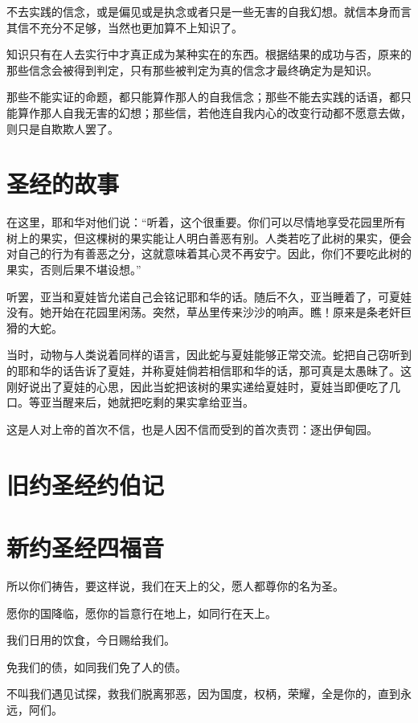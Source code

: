 \documentclass[12pt,oneside]{book}
\begin{document}
不去实践的信念，或是偏见或是执念或者只是一些无害的自我幻想。就信本身而言其信不充分不足够，当然也更加算不上知识了。

知识只有在人去实行中才真正成为某种实在的东西。根据结果的成功与否，原来的那些信念会被得到判定，只有那些被判定为真的信念才最终确定为是知识。

那些不能实证的命题，都只能算作那人的自我信念；那些不能去实践的话语，都只能算作那人自我无害的幻想；那些信，若他连自我内心的改变行动都不愿意去做，则只是自欺欺人罢了。



\section{圣经的故事}
\begin{bookref}[frametitle={\cite{圣经的故事}}]
在这里，耶和华对他们说：“听着，这个很重要。你们可以尽情地享受花园里所有树上的果实，但这棵树的果实能让人明白善恶有别。人类若吃了此树的果实，便会对自己的行为有善恶之分，这就意味着其心灵不再安宁。因此，你们不要吃此树的果实，否则后果不堪设想。”

听罢，亚当和夏娃皆允诺自己会铭记耶和华的话。随后不久，亚当睡着了，可夏娃没有。她开始在花园里闲荡。突然，草丛里传来沙沙的响声。瞧！原来是条老奸巨猾的大蛇。

当时，动物与人类说着同样的语言，因此蛇与夏娃能够正常交流。蛇把自己窃听到的耶和华的话告诉了夏娃，并称夏娃倘若相信耶和华的话，那可真是太愚昧了。这刚好说出了夏娃的心思，因此当蛇把该树的果实递给夏娃时，夏娃当即便吃了几口。等亚当醒来后，她就把吃剩的果实拿给亚当。
\end{bookref}

这是人对上帝的首次不信，也是人因不信而受到的首次责罚：逐出伊甸园。

\section{旧约圣经约伯记}



\section{新约圣经四福音}
\begin{bookref}[frametitle={\cite{新约圣经四福音}}]
所以你们祷告，要这样说，我们在天上的父，愿人都尊你的名为圣。

愿你的国降临，愿你的旨意行在地上，如同行在天上。

我们日用的饮食，今日赐给我们。

免我们的债，如同我们免了人的债。

不叫我们遇见试探，救我们脱离邪恶，因为国度，权柄，荣耀，全是你的，直到永远，阿们。
\end{bookref}
\end{document}
